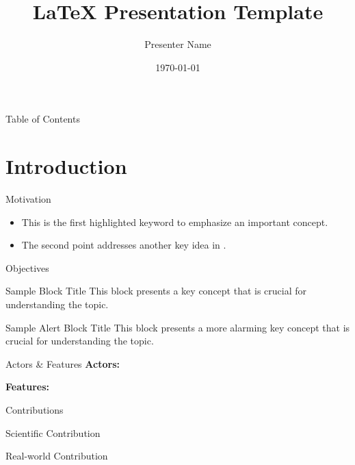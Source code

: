 \documentclass[presentation, aspectratio=169]{beamer}
\title[\LaTeX{} Presentation]{\LaTeX{} Presentation Template}
\author[Name]{Presenter Name}
\institute[short institute name]{Complete Institute Name}
\date{\today}
\begin{document}
\begin{frame}
  \titlepage
\end{frame}

\begin{frame}{Table of Contents}
	\tableofcontents
	\note{}
\end{frame}

\section{Introduction} 

\begin{frame}{Motivation}
	\begin{itemize} 	
		\item This is the first \alert{highlighted keyword} to emphasize an important concept.
		\item The second point addresses \alert{another key idea} in \cite{knuth:1984}.
	\end{itemize}
	\note{}
\end{frame}

\begin{frame}[label=objectives]{Objectives 
  \hyperlink{scope}{}
}
	\begin{block}{Sample Block Title}
		This block presents a \alert{key concept} that is crucial for understanding the topic.
	\end{block}
	\begin{alertblock}{Sample Alert Block Title}
		This block presents a more alarming \alert{key concept} that is crucial for understanding the topic.
	\end{alertblock}
	\note{}
\end{frame}

\begin{frame}{Actors \& Features}
	\textbf{Actors:}
									
	\textbf{Features:}
	\note{}
\end{frame}

\begin{frame}{Contributions}				
	\begin{block}{Scientific Contribution}
	\end{block}						
	\begin{block}{Real-world Contribution}
	\end{block}					
	\note{}
\end{frame}
\end{document}
